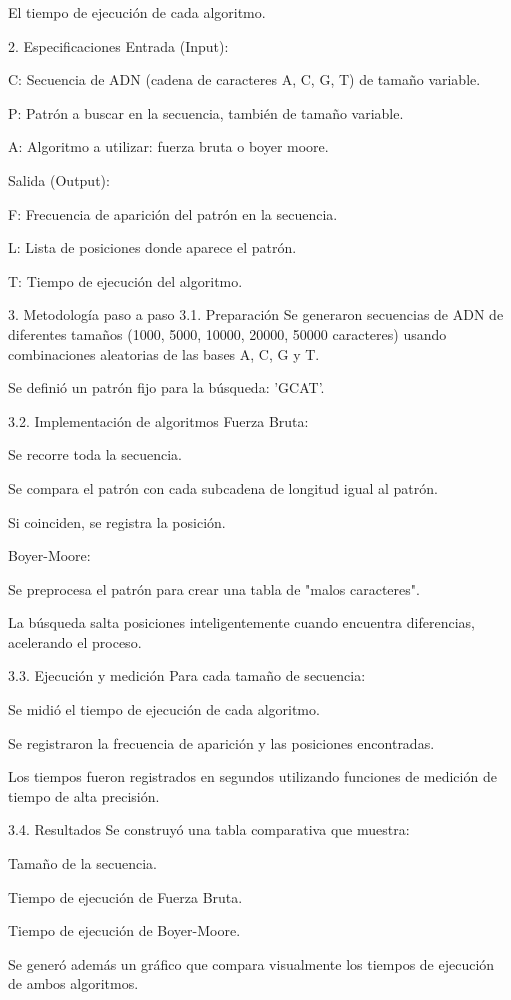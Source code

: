 \documentclass[fleqn,10pt]{article}
\begin{document}
El tiempo de ejecución de cada algoritmo.

2. Especificaciones
Entrada (Input):

C: Secuencia de ADN (cadena de caracteres A, C, G, T) de tamaño variable.

P: Patrón a buscar en la secuencia, también de tamaño variable.

A: Algoritmo a utilizar: fuerza bruta o boyer moore.

Salida (Output):

F: Frecuencia de aparición del patrón en la secuencia.

L: Lista de posiciones donde aparece el patrón.

T: Tiempo de ejecución del algoritmo.

3. Metodología paso a paso
3.1. Preparación
Se generaron secuencias de ADN de diferentes tamaños (1000, 5000, 10000, 20000, 50000 caracteres) usando combinaciones aleatorias de las bases A, C, G y T.

Se definió un patrón fijo para la búsqueda: 'GCAT'.

3.2. Implementación de algoritmos
Fuerza Bruta:

Se recorre toda la secuencia.

Se compara el patrón con cada subcadena de longitud igual al patrón.

Si coinciden, se registra la posición.

Boyer-Moore:

Se preprocesa el patrón para crear una tabla de "malos caracteres".

La búsqueda salta posiciones inteligentemente cuando encuentra diferencias, acelerando el proceso.

3.3. Ejecución y medición
Para cada tamaño de secuencia:

Se midió el tiempo de ejecución de cada algoritmo.

Se registraron la frecuencia de aparición y las posiciones encontradas.

Los tiempos fueron registrados en segundos utilizando funciones de medición de tiempo de alta precisión.

3.4. Resultados
Se construyó una tabla comparativa que muestra:

Tamaño de la secuencia.

Tiempo de ejecución de Fuerza Bruta.

Tiempo de ejecución de Boyer-Moore.

Se generó además un gráfico que compara visualmente los tiempos de ejecución de ambos algoritmos.
\end{document}
